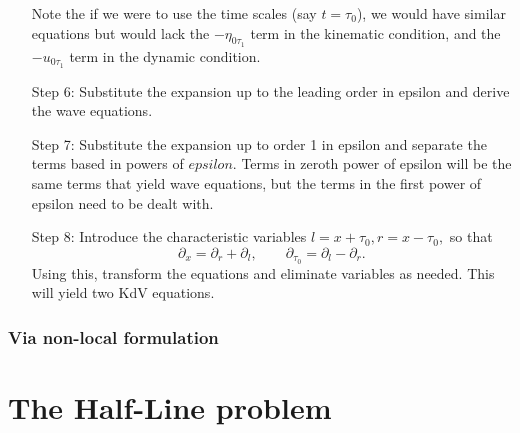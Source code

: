 \documentclass[10pt,reqno,oneside,a4paper]{article}
\begin{document}
\begin{enumerate}
Note the if we were to use the time scales (say $t = \tau_0$), we would have similar equations but would lack the $-\eta_{0\tau_1}$ term in the kinematic condition, and the $-u_{0\tau_1}$ term in the dynamic condition.
\item[Step 6:] Substitute the expansion up to the leading order in epsilon and derive the wave equations.
\item[Step 7:] Substitute the expansion up to order 1 in epsilon and separate the terms based in powers of $epsilon.$  Terms in zeroth power of epsilon will be the same terms that yield wave equations, but the terms in the first power of epsilon need to be dealt with.
\item[Step 8:] Introduce the characteristic variables $l = x + \tau_0, r = x - \tau_0,$ so that 
\[ \partial_x = \partial_r + \partial_l, \qquad \partial_{\tau_0} = \partial_l - \partial_r.\]
Using this, transform the equations and eliminate variables as needed. This will yield two KdV equations.
\end{enumerate}
\subsubsection{Via non-local formulation}

\section{The Half-Line problem}
\end{document}

